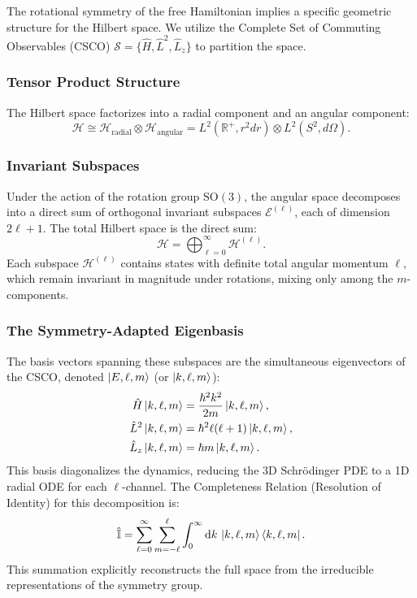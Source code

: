 The rotational symmetry of the free Hamiltonian implies a specific geometric
structure for the Hilbert space. We utilize the Complete Set of Commuting
Observables (CSCO) $\mathcal{S} = \{ \hat{H}, \hat{L}^2, \hat{L}_z \}$ to
partition the space.

\subsubsection{Tensor Product Structure}
The Hilbert space factorizes into a radial component and an angular component:
\begin{equation}
	\mathcal{H} \cong \mathcal{H}_{\text{radial}} \otimes
	\mathcal{H}_{\text{angular}} = L^2(\mathbb{R}^+, r^2 dr) \otimes L^2(S^2,
	d\Omega).
\end{equation}

\subsubsection{Invariant Subspaces}
Under the action of the rotation group $\mathrm{SO}(3)$, the angular space decomposes
into a direct sum of orthogonal invariant subspaces $\mathcal{E}^{(\ell)}$, each
of dimension $2\ell + 1$. The total Hilbert space is the direct sum:
\begin{equation}
	\mathcal{H} = \bigoplus_{\ell=0}^{\infty} \mathcal{H}^{(\ell)}.
\end{equation}
Each subspace $\mathcal{H}^{(\ell)}$ contains states with definite total angular
momentum $\ell$, which remain invariant in magnitude under rotations, mixing
only among the $m$-components.

\subsubsection{The Symmetry-Adapted Eigenbasis}
The basis vectors spanning these subspaces are the simultaneous eigenvectors of
the CSCO, denoted $\ket{E, \ell, m}$ (or $\ket{k, \ell, m}$):
\begin{align}
	\hat{H} \ket{k, \ell, m} &= \frac{\hbar^2 k^2}{2m} \ket{k, \ell, m}, \\
	\hat{L}^2 \ket{k, \ell, m} &= \hbar^2 \ell(\ell+1) \ket{k, \ell, m}, \\
	\hat{L}_z \ket{k, \ell, m} &= \hbar m \ket{k, \ell, m}.
\end{align}
This basis diagonalizes the dynamics, reducing the 3D Schrödinger PDE to a 1D
radial ODE for each $\ell$-channel. The Completeness Relation (Resolution of
Identity) for this decomposition is:
\begin{equation}
	\hat{\mathbb{I}} = \sum_{\ell=0}^{\infty} \sum_{m=-\ell}^{\ell}
	\int_0^\infty \mathrm{d}k \, \ket{k, \ell, m}\bra{k, \ell, m}.
\end{equation}
This summation explicitly reconstructs the full space from the irreducible
representations of the symmetry group.

